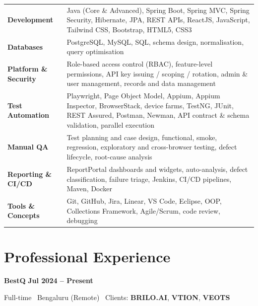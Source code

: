 \documentclass[a4paper,10pt]{article}
\newcommand{\company}[2]{%
  \vspace{1pt}%
  {\color{ink}\bfseries\fontsize{12}{14}\selectfont #1}%
  \hfill%
  {\color{ink}\bfseries\small #2}%
  \par%
}
\newcommand{\companymeta}[1]{%
  {\color{muted}\small #1}\par\vspace{2pt}%
}
\newcommand{\skillrow}[2]{%
  {\color{ink}\bfseries #1} & #2 \\[2.5pt]%
}
\begin{document}
\begin{tabularx}{\textwidth}{@{}p{2.55cm}>{\raggedright\arraybackslash}X@{}}
  \skillrow{Development}{Java (Core \& Advanced), Spring Boot, Spring MVC, Spring Security,
    Hibernate, JPA, REST APIs, ReactJS, JavaScript, Tailwind CSS, Bootstrap, HTML5, CSS3}
  \skillrow{Databases}{PostgreSQL, MySQL, SQL, schema design, normalisation, query optimisation}
  \skillrow{Platform \& Security}{Role-based access control (RBAC), feature-level permissions,
    API key issuing / scoping / rotation, admin \& user management, records and data management}
  \skillrow{Test Automation}{Playwright, Page Object Model, Appium, Appium Inspector, BrowserStack,
    device farms, TestNG, JUnit, REST Assured, Postman, Newman, API contract \& schema validation,
    parallel execution}
  \skillrow{Manual QA}{Test planning and case design, functional, smoke, regression, exploratory
    and cross-browser testing, defect lifecycle, root-cause analysis}
  \skillrow{Reporting \& CI/CD}{ReportPortal dashboards and widgets, auto-analysis, defect
    classification, failure triage, Jenkins, CI/CD pipelines, Maven, Docker}
  \skillrow{Tools \& Concepts}{Git, GitHub, Jira, Linear, VS Code, Eclipse, OOP, Collections
    Framework, Agile/Scrum, code review, debugging}
\end{tabularx}

\section{Professional Experience}

\company{BestQ}{Jul 2024 -- Present}
\companymeta{Full-time \textperiodcentered\ Bengaluru (Remote) \textperiodcentered\ Clients:
  {\color{ink}\bfseries BRILO.AI}, {\color{ink}\bfseries VTION}, {\color{ink}\bfseries VEOTS}}
\end{document}
